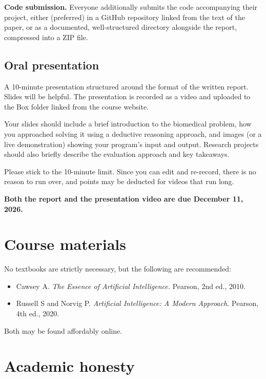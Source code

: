 \documentclass[11pt]{article}
\begin{document}
\textbf{Code submission.} Everyone additionally submits the code accompanying their project,
either (preferred) in a GitHub repository linked from the text of the paper, or as a documented,
well-structured directory alongside the report, compressed into a ZIP file.

\subsection{Oral presentation}

A 10-minute presentation structured around the format of the written report. Slides will be
helpful. The presentation is recorded as a video and uploaded to the Box folder linked from the
course website.

Your slides should include a brief introduction to the biomedical problem, how you approached
solving it using a deductive reasoning approach, and images (or a live demonstration) showing
your program's input and output. Research projects should also briefly describe the evaluation
approach and key takeaways.

Please stick to the 10-minute limit. Since you can edit and re-record, there is no reason to run
over, and points may be deducted for videos that run long.

\textbf{Both the report and the presentation video are due December 11, 2026.}

\section{Course materials}

No textbooks are strictly necessary, but the following are recommended:

\begin{itemize}
  \item Cawsey A. \emph{The Essence of Artificial Intelligence.} Pearson, 2nd ed., 2010.
  \item Russell S and Norvig P. \emph{Artificial Intelligence: A Modern Approach.} Pearson,
        4th ed., 2020.
\end{itemize}

Both may be found affordably online.

\section{Academic honesty}
\end{document}

